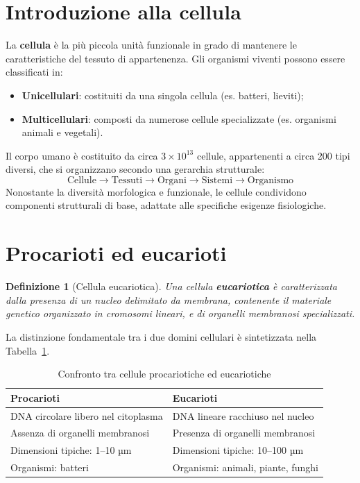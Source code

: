 \documentclass[12pt,a4paper]{report}
\newtheorem{definizione}{Definizione}[section]
\begin{document}
\section{Introduzione alla cellula}
La \textbf{cellula} è la più piccola unità funzionale in grado di mantenere le caratteristiche del tessuto di appartenenza. Gli organismi viventi possono essere classificati in:
\begin{itemize}
\item \textbf{Unicellulari}: costituiti da una singola cellula (es. batteri, lieviti);
\item \textbf{Multicellulari}: composti da numerose cellule specializzate (es. organismi animali e vegetali).
\end{itemize}
Il corpo umano è costituito da circa \(3 \times 10^{13}\) cellule, appartenenti a circa 200 tipi diversi, che si organizzano secondo una gerarchia strutturale:
\[
\text{Cellule} \rightarrow \text{Tessuti} \rightarrow \text{Organi} \rightarrow \text{Sistemi} \rightarrow \text{Organismo}
\]
Nonostante la diversità morfologica e funzionale, le cellule condividono componenti strutturali di base, adattate alle specifiche esigenze fisiologiche.

\section{Procarioti ed eucarioti}
\begin{definizione}[Cellula eucariotica]
Una cellula \textbf{eucariotica} è caratterizzata dalla presenza di un nucleo delimitato da membrana, contenente il materiale genetico organizzato in cromosomi lineari, e di organelli membranosi specializzati.
\end{definizione}
La distinzione fondamentale tra i due domini cellulari è sintetizzata nella Tabella~\ref{tab:procarioti-eucarioti}.
\begin{table}[htbp]
\centering
\caption{Confronto tra cellule procariotiche ed eucariotiche}
\label{tab:procarioti-eucarioti}
\renewcommand{\arraystretch}{1.2}
\begin{tabular}{@{} p{} p{} @{}}
\toprule
\textbf{Procarioti} & \textbf{Eucarioti} \\
\midrule
DNA circolare libero nel citoplasma & DNA lineare racchiuso nel nucleo \\
Assenza di organelli membranosi & Presenza di organelli membranosi \\
Dimensioni tipiche: 1--10 µm & Dimensioni tipiche: 10--100 µm \\
Organismi: batteri & Organismi: animali, piante, funghi \\
\bottomrule
\end{tabular}
\end{table}
\end{document}
